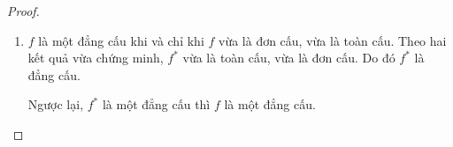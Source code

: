 \begin{proof}
\begin{enumerate}[label = (\arabic*)]
              Suy ra, $\forall\beta^{*}\in {W}^{*}$, $\beta^{*}(f(\alpha) - \beta) = 0$. Do đó, $f(\alpha) = \beta$.
              
              Như vậy, $\forall\beta\in W, \exists\alpha\in V: f(\alpha) = \beta$. Do đó $f$ là một toàn ánh.
        \item $f$ là một đẳng cấu khi và chỉ khi $f$ vừa là đơn cấu, vừa là toàn cấu. Theo hai kết quả vừa chứng minh, $f^{*}$ vừa là toàn cấu, vừa là đơn cấu. Do đó $f^{*}$ là đẳng cấu.
              
              Ngược lại, $f^{*}$ là một đẳng cấu thì $f$ là một đẳng cấu.
    \end{enumerate}
\end{proof}

